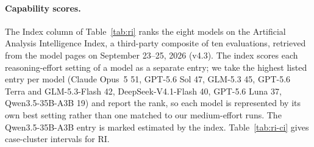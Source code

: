 \paragraph{Capability scores.} The Index column of Table~\ref{tab:ri}
ranks the eight models on the Artificial Analysis Intelligence Index, a
third-party composite of ten evaluations, retrieved from the model pages
on September 23--25, 2026 (v4.3). The index scores each reasoning-effort
setting of a model as a separate entry; we take the highest listed entry
per model (Claude Opus~5 51, GPT-5.6 Sol 47, GLM-5.3 45, GPT-5.6 Terra
and GLM-5.3-Flash 42, DeepSeek-V4.1-Flash 40, GPT-5.6 Luna 37,
Qwen3.5-35B-A3B 19) and report the rank, so each model is represented by
its own best setting rather than one matched to our medium-effort runs.
The Qwen3.5-35B-A3B entry is marked estimated by the index. Table~\ref{tab:ri-ci}
gives case-cluster intervals for RI.


